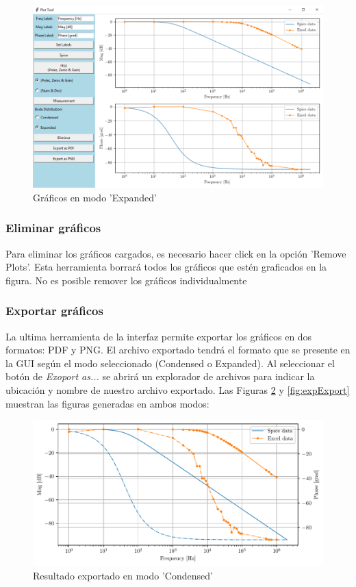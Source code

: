 \begin{figure}[ht]
\centering
\includegraphics[scale=0.15]{resources/expanded.png}
\caption{Gráficos en modo 'Expanded'}
\label{fig:expanded}
\end{figure}

\subsubsection{Eliminar gráficos}
Para eliminar los gráficos cargados, es necesario hacer click en la opción 'Remove Plots'. Esta herramienta borrará todos los gráficos que estén graficados en la figura. No es posible remover los gráficos individualmente

\subsubsection{Exportar gráficos}
La ultima herramienta de la interfaz permite exportar los gráficos en dos formatos: PDF y PNG. El archivo exportado tendrá el formato que se presente en la GUI según el modo seleccionado (Condensed o Expanded). Al seleccionar el botón de \emph{Exoport as...} se abrirá un explorador de archivos para indicar la ubicación y nombre de nuestro archivo exportado. Las Figuras \ref{fig:condExport} y \ref{fig:expExport} muestran las figuras generadas en ambos modos:

\begin{figure}[ht]
\centering
\includegraphics[scale=0.7]{resources/condExport.pdf}
\caption{Resultado exportado en modo 'Condensed'}
\label{fig:condExport}
\end{figure}


